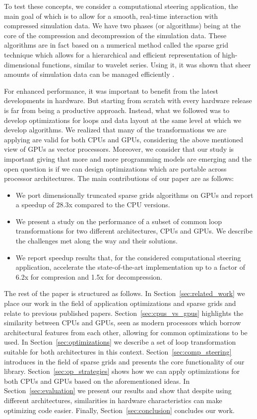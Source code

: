 To test these concepts, we consider a computational steering application, the
main goal of which is to allow for a smooth, real-time interaction with
compressed simulation data. We have two phases (or algorithms) being at the core
of the compression and decompression of the simulation data. These algorithms
are in fact based on a numerical method called the sparse grid technique which
allows for a hierarchical and efficient representation of high-dimensional
functions, similar to wavelet series. Using it, it was shown that sheer amounts
of simulation data can be managed efficiently \cite{Butnaru201156}.

For enhanced performance, it was important to benefit from the latest
developments in hardware. But starting from scratch with every hardware release
is far from being a productive approach. Instead, what we followed was to
develop optimizations for loops and data layout at the same level at which we
develop algorithms. We realized that many of the transformations we are applying
are valid for both CPUs and GPUs, considering the above mentioned view of GPUs
as vector processors. Moreover, we consider that our study is important giving
that more and more programming models are emerging and the open question is if
we can design optimizations which are portable across processor architectures.
The main contributions of our paper are as follows:

\begin{itemize}
  \item We port dimensionally truncated sparse grids algorithms on GPUs and
  report a speedup of 28.3x compared to the CPU versions.
  \item We present a study on the performance of a subset of common loop
  transformations for two different architectures, CPUs and GPUs. We describe
  the challenges met along the way and their solutions.
  \item We report speedup results that, for the considered computational
  steering application, accelerate the state-of-the-art implementation up to a
  factor of 6.2x for compresion and 1.5x for decompression.
\end{itemize}

The rest of the paper is structured as follows. In
Section~\ref{sec:related_work} we place our work in the field of application
optimizations and sparse grids and relate to previous published papers.
Section~\ref{sec:cpus_vs_gpus} highlights the similarity between CPUs and GPUs,
seen as modern processors which borrow architectural features from each other,
allowing for common optimizations to be used.
In Section~\ref{sec:optimizations} we describe a set of loop transformation
suitable for both architectures in this context. Section~\ref{sec:comp_steering}
introduces in the field of sparse grids and presents the core functionality of
our library. Section~\ref{sec:op_strategies} shows how we can apply
optimizations for both CPUs and GPUs based on the aforementioned ideas. In
Section~\ref{sec:evaluation} we present our results and show that despite using
different architectures, similarities in hardware characteristics can make
optimizing code easier. Finally, Section~\ref{sec:conclusion} concludes our
work.
